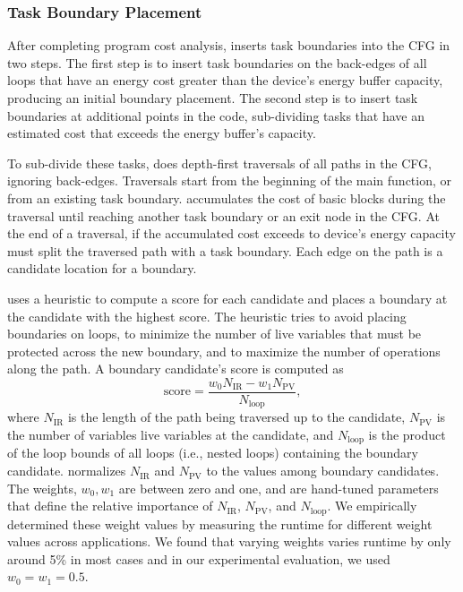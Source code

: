 \subsubsection{Task Boundary Placement}
\label{sec:compiler_boundary}

After completing program cost analysis, \sys inserts task boundaries into the CFG in two steps. The first step is to insert task boundaries on the back-edges of all loops that have an energy cost greater than the device's energy buffer capacity, producing an initial boundary placement. The second step is to insert task boundaries at additional points in the code, sub-dividing tasks that have an estimated cost that exceeds the energy buffer's capacity.

To sub-divide these tasks, \sys does depth-first traversals of all paths in the CFG, ignoring back-edges. Traversals start from the beginning of the main function, or from an existing task boundary. \sys accumulates the cost of basic blocks during the traversal until reaching another task boundary or an exit node in the CFG. At the end of a traversal, if the accumulated cost exceeds to device's energy capacity \sys must split the traversed path with a task boundary. Each edge on the path is a candidate location for a boundary.

\sys uses a heuristic to compute a score for each candidate and places a boundary at the candidate with the highest score. The heuristic tries to avoid placing boundaries on loops, to minimize the number of live variables that must be protected across the new boundary, and to maximize the number of operations along the path. A boundary candidate's score is computed as
%
\begin{equation}
\text{score} = \frac{w_{0} N_{\text{IR}} - w_{1} N_{\text{PV}}}{N_{\text{loop}}},\nonumber
\end{equation}
%
where $N_{\text{IR}}$ is the length of the path being traversed up to the candidate, $N_{\text{PV}}$ is the number of variables live variables at the candidate, and $N_{\text{loop}}$ is the product of the loop bounds of all loops (i.e., nested loops) containing the boundary candidate. \sys normalizes $N_{\text{IR}}$ and $N_{\text{PV}}$ to the values among boundary candidates. The weights, $w_{0}, w_{1}$ are between zero and one, and are hand-tuned parameters that define the relative importance of $N_{\text{IR}}$,
$N_{\text{PV}}$, and $N_{\text{loop}}$. We empirically determined these weight values by measuring the runtime for different weight values across applications. We found that varying weights varies runtime by only around 5\% in most cases and in our experimental evaluation, we used $w_{0} = w_{1} = 0.5$.

